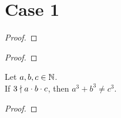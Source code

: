
\chapter*{Case 1}

\begin{lemma}
  \label{lmm:cube_of_castHom_ne_zero}
  \leanok
\end{lemma}
\begin{proof}
  \leanok
\end{proof}

\begin{lemma}
  \label{lmm:cube_of_not_dvd}
  \leanok
\end{lemma}
\begin{proof}
  \leanok
\end{proof}

\begin{theorem}
    \label{thm:fermatLastTheoremThree_case_1}
    \leanok
    Let $a, b, c \in \mathbb{N}$. \\
    If $3 \nmid a \cdot b \cdot c$, then $a ^ 3 + b ^ 3 \neq c ^ 3$.
\end{theorem}
\begin{proof}
  \leanok
\end{proof}
